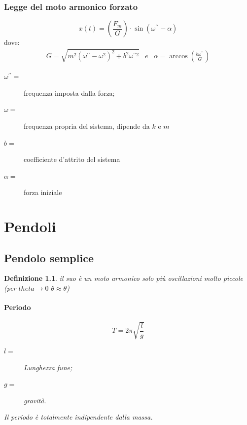 \documentclass{book}
\newtheorem{defi}{Definizione}[section]
\begin{document}
\subsection{Legge del moto armonico forzato}
\label{sec:leggedelmotoarmforz}

\begin{equation}
  \label{eq:leggedelmotoarmforz}
  x(t)=\left(\frac{F_m}{G}\right)\cdot \sin(\omega^{\prime\prime}-\alpha)
\end{equation}
dove:
\begin{eqnarray}
  \label{eq:leggedelmotoarmforz2}
  G=\sqrt{m^2(\omega^{\prime\prime}-\omega^2)^2+b^2\omega^{\prime\prime2}} &e& \alpha=\arccos\left(\frac{b\omega^{\prime\prime}}{G}\right)
\end{eqnarray}
\begin{description}
\item[$\omega^{\prime\prime}=$] frequenza imposta dalla forza;
\item[$\omega=$] frequenza propria del sistema, dipende da $k$ e $m$
\item[$b=$] coefficiente d'attrito del sistema
\item[$\alpha=$] forza iniziale
\end{description}

\chapter{Pendoli}
\label{chap:pendoli}

\section{Pendolo semplice}
\label{sec:pensem}

\begin{defi}
  il suo è un moto armonico solo più oscillazioni molto piccole (per $theta\to 0$ $\theta\approx\theta$)
  \subsubsection{Periodo}
  \label{sec:perpensem}
  \begin{equation}
    \label{eq:pensem}
    T=2\pi\sqrt{\frac{l}{g}}
  \end{equation}
  \begin{description}
  \item[$l=$] Lunghezza fune;
  \item[$g=$] gravità.
  \end{description}
  Il periodo è totalmente indipendente dalla massa.
\end{defi}
\end{document}
